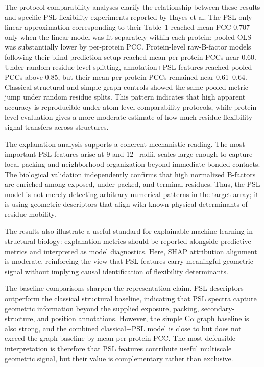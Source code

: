 \documentclass[11pt]{article}
\newcommand{\angstrom}{\text{\normalfont\AA}\xspace}
\newcommand{\calpha}{C\ensuremath{\alpha}\xspace}
\begin{document}
The protocol-comparability analyses clarify the relationship between these results and specific PSL flexibility experiments reported by Hayes et al. The PSL-only linear approximation corresponding to their Table~1 reached mean PCC 0.707 only when the linear model was fit separately within each protein; pooled OLS was substantially lower by per-protein PCC. Protein-level raw-B-factor models following their blind-prediction setup reached mean per-protein PCCs near 0.60. Under random residue-level splitting, annotation+PSL features reached pooled PCCs above 0.85, but their mean per-protein PCCs remained near 0.61--0.64. Classical structural and simple graph controls showed the same pooled-metric jump under random residue splits. This pattern indicates that high apparent accuracy is reproducible under atom-level comparability protocols, while protein-level evaluation gives a more moderate estimate of how much residue-flexibility signal transfers across structures.

The explanation analysis supports a coherent mechanistic reading. The most important PSL features arise at 9 and 12~\angstrom radii, scales large enough to capture local packing and neighborhood organization beyond immediate bonded contacts. The biological validation independently confirms that high normalized B-factors are enriched among exposed, under-packed, and terminal residues. Thus, the PSL model is not merely detecting arbitrary numerical patterns in the target array; it is using geometric descriptors that align with known physical determinants of residue mobility.

The results also illustrate a useful standard for explainable machine learning in structural biology: explanation metrics should be reported alongside predictive metrics and interpreted as model diagnostics. Here, SHAP attribution alignment is moderate, reinforcing the view that PSL features carry meaningful geometric signal without implying causal identification of flexibility determinants.

The baseline comparisons sharpen the representation claim. PSL descriptors outperform the classical structural baseline, indicating that PSL spectra capture geometric information beyond the supplied exposure, packing, secondary-structure, and position annotations. However, the simple \calpha graph baseline is also strong, and the combined classical+PSL model is close to but does not exceed the graph baseline by mean per-protein PCC. The most defensible interpretation is therefore that PSL features contribute useful multiscale geometric signal, but their value is complementary rather than exclusive.
\end{document}
